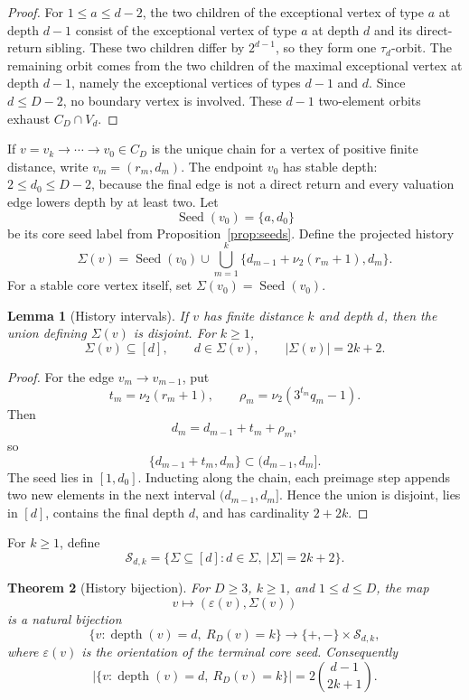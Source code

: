 \documentclass[11pt]{article}
\newtheorem{theorem}{Theorem}[section]
\newtheorem{lemma}[theorem]{Lemma}
\theoremstyle{definition}
\theoremstyle{remark}
\newcommand{\nuu}{\nu_2}
\newcommand{\depth}{\operatorname{depth}}
\newcommand{\Seed}{\operatorname{Seed}}
\newcommand{\Sfam}{\mathcal S}
\newcommand{\eps}{\varepsilon}
\begin{document}
\begin{proof}
For $1\le a\le d-2$, the two children of the exceptional vertex of type $a$ at depth $d-1$ consist of the exceptional vertex of type $a$ at depth $d$ and its direct-return sibling.  These two children differ by $2^{d-1}$, so they form one $\tau_d$-orbit.  The remaining orbit comes from the two children of the maximal exceptional vertex at depth $d-1$, namely the exceptional vertices of types $d-1$ and $d$.  Since $d\le D-2$, no boundary vertex is involved.  These $d-1$ two-element orbits exhaust $C_D\cap V_d$.
\end{proof}

If $v=v_k\to\cdots\to v_0\in C_D$ is the unique chain for a vertex of positive finite distance, write $v_m=(r_m,d_m)$.  The endpoint $v_0$ has stable depth: $2\le d_0\le D-2$, because the final edge is not a direct return and every valuation edge lowers depth by at least two.  Let
\[
\Seed(v_0)=\{a,d_0\}
\]
be its core seed label from Proposition~\ref{prop:seeds}.  Define the projected history
\[
\Sigma(v)=\Seed(v_0)\cup\bigcup_{m=1}^k\{d_{m-1}+\nuu(r_m+1),d_m\}.
\]
For a stable core vertex itself, set $\Sigma(v_0)=\Seed(v_0)$.

\begin{lemma}[History intervals]\label{lem:historyintervals}
If $v$ has finite distance $k$ and depth $d$, then the union defining $\Sigma(v)$ is disjoint.  For $k\ge1$,
\[
\Sigma(v)\subseteq[d],\qquad d\in\Sigma(v),\qquad |\Sigma(v)|=2k+2.
\]
\end{lemma}

\begin{proof}
For the edge $v_m\to v_{m-1}$, put
\[
t_m=\nuu(r_m+1),\qquad \rho_m=\nuu(3^{t_m}q_m-1).
\]
Then
\[
d_m=d_{m-1}+t_m+\rho_m,
\]
so
\[
\{d_{m-1}+t_m,d_m\}\subset(d_{m-1},d_m].
\]
The seed lies in $[1,d_0]$.  Inducting along the chain, each preimage step appends two new elements in the next interval $(d_{m-1},d_m]$.  Hence the union is disjoint, lies in $[d]$, contains the final depth $d$, and has cardinality $2+2k$.
\end{proof}

For $k\ge1$, define
\[
\Sfam_{d,k}=\{\Sigma\subseteq[d]:d\in\Sigma,\ |\Sigma|=2k+2\}.
\]

\begin{theorem}[History bijection]\label{thm:bijection}
For $D\ge3$, $k\ge1$, and $1\le d\le D$, the map
\[
v\longmapsto (\eps(v),\Sigma(v))
\]
is a natural bijection
\[
\{v:\depth(v)=d,\ R_D(v)=k\}
\longrightarrow
\{+,-\}\times\Sfam_{d,k},
\]
where $\eps(v)$ is the orientation of the terminal core seed.  Consequently
\[
\bigl|\{v:\depth(v)=d,\ R_D(v)=k\}\bigr|=2\binom{d-1}{2k+1}.
\]
\end{theorem}
\end{document}
